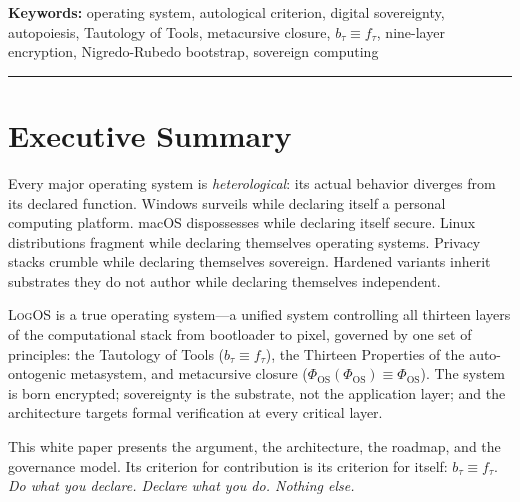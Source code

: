 \documentclass[11pt, oneside]{article}
\newcommand{\LogOS}{\textnormal{\textsc{LogOS}}}
\begin{document}
\vspace{0.8em}

\begin{center}
\begin{minipage}{0.85\textwidth}
\small\noindent\textbf{Keywords:} operating system, autological criterion, digital sovereignty, autopoiesis, Tautology of Tools, metacursive closure, $b_\tau \equiv f_\tau$, nine-layer encryption, Nigredo-Rubedo bootstrap, sovereign computing
\end{minipage}
\end{center}

\vspace{1em}
{\color{LogosGray}\centering\rule{0.45\textwidth}{0.4pt}\par}
\vspace{1.2em}

\tableofcontents
\newpage

\section*{Executive Summary}

\noindent Every major operating system is
\textit{heterological}: its actual behavior diverges from its declared
function.
Windows surveils while declaring itself a personal computing platform.
macOS dispossesses while declaring itself secure. Linux distributions
fragment while declaring themselves operating systems. Privacy stacks
crumble while declaring themselves sovereign. Hardened variants inherit
substrates they do not author while declaring themselves independent.

\LogOS{} is a true operating system---a unified system
controlling all thirteen layers of the computational stack from
bootloader to pixel, governed by one set of principles:
the Tautology of Tools ($b_\tau \equiv f_\tau$), the Thirteen
Properties of the auto-ontogenic metasystem, and metacursive closure
($\Phi_{\mathrm{OS}}(\Phi_{\mathrm{OS}}) \equiv \Phi_{\mathrm{OS}}$).
The system is born encrypted; sovereignty is the substrate, not the
application layer; and the architecture targets formal verification at
every critical layer.

This white paper presents the argument, the architecture, the roadmap,
and the governance model. Its criterion for contribution is its criterion
for itself: $b_\tau \equiv f_\tau$. \textit{Do what you declare. Declare
what you do. Nothing else.}
\end{document}
